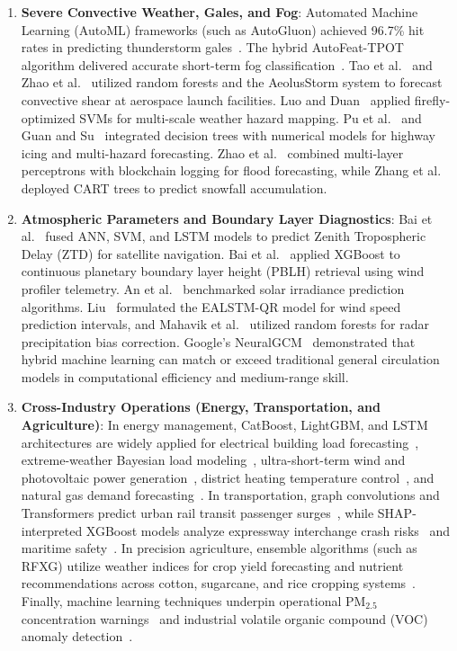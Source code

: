 \begin{enumerate}
    \item \textbf{Severe Convective Weather, Gales, and Fog}: Automated Machine Learning (AutoML) frameworks (such as AutoGluon) achieved 96.7\% hit rates in predicting thunderstorm gales~\cite{ref25,ref26}. The hybrid AutoFeat-TPOT algorithm delivered accurate short-term fog classification~\cite{ref27}. Tao et al.~\cite{ref28} and Zhao et al.~\cite{ref29} utilized random forests and the AeolusStorm system to forecast convective shear at aerospace launch facilities. Luo and Duan~\cite{ref30} applied firefly-optimized SVMs for multi-scale weather hazard mapping. Pu et al.~\cite{ref31} and Guan and Su~\cite{ref32} integrated decision trees with numerical models for highway icing and multi-hazard forecasting. Zhao et al.~\cite{ref33} combined multi-layer perceptrons with blockchain logging for flood forecasting, while Zhang et al.~\cite{ref34} deployed CART trees to predict snowfall accumulation.
    \item \textbf{Atmospheric Parameters and Boundary Layer Diagnostics}: Bai et al.~\cite{ref35} fused ANN, SVM, and LSTM models to predict Zenith Tropospheric Delay (ZTD) for satellite navigation. Bai et al.~\cite{ref36} applied XGBoost to continuous planetary boundary layer height (PBLH) retrieval using wind profiler telemetry. An et al.~\cite{ref37} benchmarked solar irradiance prediction algorithms. Liu~\cite{ref38} formulated the EALSTM-QR model for wind speed prediction intervals, and Mahavik et al.~\cite{ref39} utilized random forests for radar precipitation bias correction. Google's NeuralGCM~\cite{ref40} demonstrated that hybrid machine learning can match or exceed traditional general circulation models in computational efficiency and medium-range skill.
    \item \textbf{Cross-Industry Operations (Energy, Transportation, and Agriculture)}: In energy management, CatBoost, LightGBM, and LSTM architectures are widely applied for electrical building load forecasting~\cite{ref41}, extreme-weather Bayesian load modeling~\cite{ref42}, ultra-short-term wind and photovoltaic power generation~\cite{ref43,ref44,ref45}, district heating temperature control~\cite{ref46,ref47,ref48}, and natural gas demand forecasting~\cite{ref49}. In transportation, graph convolutions and Transformers predict urban rail transit passenger surges~\cite{ref50}, while SHAP-interpreted XGBoost models analyze expressway interchange crash risks~\cite{ref51} and maritime safety~\cite{ref52}. In precision agriculture, ensemble algorithms (such as RFXG) utilize weather indices for crop yield forecasting and nutrient recommendations across cotton, sugarcane, and rice cropping systems~\cite{ref53,ref54,ref55,ref56,ref57,ref58,ref59}. Finally, machine learning techniques underpin operational $\text{PM}_{2.5}$ concentration warnings~\cite{ref1,ref60} and industrial volatile organic compound (VOC) anomaly detection~\cite{ref61}.
\end{enumerate}

